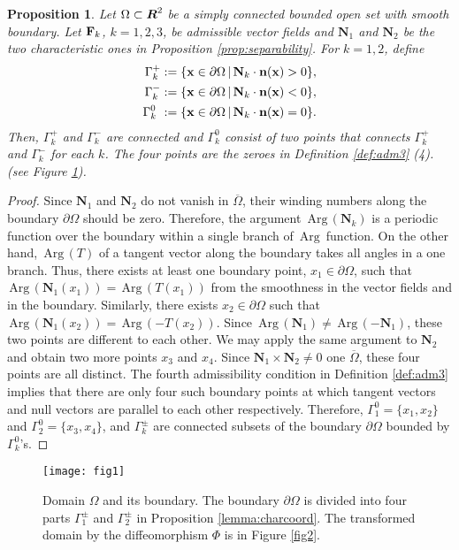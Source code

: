 \documentclass[11pt]{amsart}
\theoremstyle{plain}
\newtheorem{Prop}[Thm]{Proposition}
\numberwithin{equation}{section}
\numberwithin{Thm}{section}
\def\R{\mbox{\boldmath$R$}}
\def\N{{\mathbf N}}
\def\F{{\bf F}}
\def\x{{\bf x}}
\def\n{{\bf n}}
\def\Arg{{\,\textrm{Arg}\,}}
\begin{document}
\begin{Prop} \label{lemma:anisogeom}
Let $\Omega\subset\R^2$  be a simply connected bounded open set with smooth boundary. Let $\F_k$, $k=1,2,3$, be admissible vector fields and $\N_1$ and $\N_2$ be the two characteristic ones in Proposition \ref{prop:separability}. For $k=1,2$, define
\begin{eqnarray}
\nonumber\Gamma_k^+:=\{\x\in\partial\Omega\,|\, \N_k\cdot\n(\x)>0\},\\ \label{Gamma1}\Gamma_k^-:=\{\x\in\partial\Omega\,|\, \N_k\cdot\n(\x)<0\},\\ \nonumber\Gamma_k^0\ :=\{\x\in\partial\Omega\,|\, \N_k\cdot\n(\x)=0\}.
\end{eqnarray}
Then, $\Gamma_k^+$ and $\Gamma_k^-$ are connected and $\Gamma_k^0$ consist of two points that connects $\Gamma_k^+$ and $\Gamma_k^-$ for each $k$. The four points are the zeroes in Definition \ref{def:adm3} (4). (see Figure \ref{fig1}).
\end{Prop}
\begin{proof}
Since $\N_1$ and $\N_2$ do not vanish in $\overline\Omega$, their winding numbers along the boundary $\partial\Omega$ should be zero. Therefore, the argument $\Arg(\N_k)$ is a periodic function over the boundary within a single branch of $\Arg$ function. On the other hand, $\Arg(T)$ of a tangent vector along the boundary takes all angles in a one branch. Thus, there exists at least one boundary point, $x_1\in\partial\Omega$, such that $\Arg(\N_1(x_1))=\Arg(T(x_1))$ from the smoothness in the vector fields and in the boundary. Similarly, there exists $x_2\in\partial\Omega$ such that $\Arg(\N_1(x_2))=\Arg(-T(x_2))$. Since $\Arg(\N_1)\ne\Arg(-\N_1)$, these two points are different to each other. We may apply the same argument to $\N_2$ and obtain two more points $x_3$ and $x_4$. Since $\N_1 \times \N_2 \ne 0$ one $\overline\Omega$, these four points are all distinct. The fourth admissibility condition in Definition \ref{def:adm3} implies that there are only four such boundary points at which tangent vectors and null vectors are parallel to each other respectively. Therefore, $\Gamma_1^0=\{x_1,x_2\}$ and $\Gamma_2^0=\{x_3,x_4\}$, and $\Gamma_k^\pm$ are connected subsets of the boundary $\partial\Omega$ bounded by $\Gamma_k^0$'s.
\end{proof}
\begin{figure}
  \center
  \texttt{[image: fig1]}
  \caption{Domain $\Omega$ and its boundary. The boundary $\partial\Omega$ is divided into four parts $\Gamma_1^\pm$ and $\Gamma_2^\pm$ in Proposition \ref{lemma:charcoord}. The transformed domain by the diffeomorphism $\Phi$ is in Figure \ref{fig2}. } \label{fig1}
\end{figure}
\end{document}
